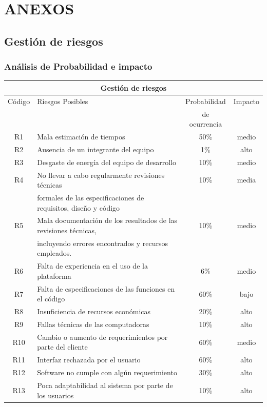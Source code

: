 \documentclass[11pt,letterpaper]{report}
\begin{document}
\chapter{ANEXOS}
\section{Gestión de riesgos}
\subsection{Análisis de Probabilidad e impacto}
\begin{tabular}{|c|l|c|c|}
	\hline
	\multicolumn{4}{|c|}{Gestión de riesgos}\\ \hline
	Código & Riesgos Posibles & Probabilidad & Impacto \\ 
	& & de ocurrencia & \\ \hline
	R1 & Mala estimación de tiempos  & 50\% & medio \\ \hline
	R2 & Ausencia de un integrante del equipo & 1\% & alto \\ \hline
	R3 & Desgaste de energía del equipo de desarrollo & 10\% & medio  \\ \hline
	R4 & No llevar a cabo regularmente revisiones técnicas  & 10\% & media \\ 
	& formales de las especificaciones de requisitos, diseño y código & & \\ \hline
	R5 & Mala documentación de los resultados de las revisiones técnicas,  & 10\% & medio \\ 
	& incluyendo errores encontrados y recursos empleados. && \\ \hline
	R6 & Falta de experiencia en el uso de la plataforma & 6\% & medio \\ \hline
	R7 & Falta de especificaciones de las funciones en el código & 60\% & bajo \\ \hline
	R8 & Insuficiencia de recursos económicas & 20\% & alto \\ \hline
	R9 & Fallas técnicas de las computadoras & 10\% & alto \\ \hline
	R10 & Cambio o aumento de requerimientos por parte del cliente & 60\% & medio \\ \hline
	R11 & Interfaz rechazada por el usuario & 60\% & alto \\ \hline
	R12 & Software no cumple con algún requerimiento & 30\% & alto \\ \hline
	R13 & Poca adaptabilidad al sistema por parte de los usuarios & 10\% & alto  \\ \hline

\end{tabular}
\end{document}
